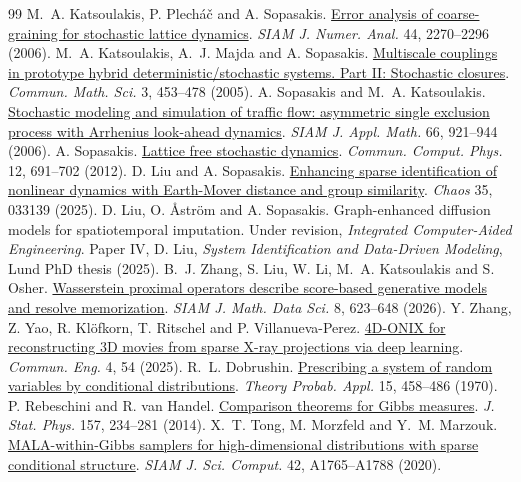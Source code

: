 \documentclass[12pt,a4paper]{article}
\begin{document}
\begingroup
\fontsize{9}{10.5}\selectfont
\begin{thebibliography}{99}
\setlength{\itemsep}{0pt}\setlength{\parskip}{0pt}
 M.~A. Katsoulakis, P. Plech\'a\v{c} and A. Sopasakis. \href{https://doi.org/10.1137/050637339}{Error analysis of coarse-graining for stochastic lattice dynamics}. \emph{SIAM J. Numer. Anal.} 44, 2270--2296 (2006).
 M.~A. Katsoulakis, A.~J. Majda and A. Sopasakis. \href{https://doi.org/10.4310/CMS.2005.v3.n3.a9}{Multiscale couplings in prototype hybrid deterministic/stochastic systems. Part II: Stochastic closures}. \emph{Commun. Math. Sci.} 3, 453--478 (2005).
 A. Sopasakis and M.~A. Katsoulakis. \href{https://doi.org/10.1137/040617790}{Stochastic modeling and simulation of traffic flow: asymmetric single exclusion process with Arrhenius look-ahead dynamics}. \emph{SIAM J. Appl. Math.} 66, 921--944 (2006).
 A. Sopasakis. \href{https://doi.org/10.4208/cicp.110211.200611a}{Lattice free stochastic dynamics}. \emph{Commun. Comput. Phys.} 12, 691--702 (2012).
 D. Liu and A. Sopasakis. \href{https://doi.org/10.1063/5.0214404}{Enhancing sparse identification of nonlinear dynamics with Earth-Mover distance and group similarity}. \emph{Chaos} 35, 033139 (2025).
 D. Liu, O. \AA{}str\"om and A. Sopasakis. Graph-enhanced diffusion models for spatiotemporal imputation. Under revision, \emph{Integrated Computer-Aided Engineering}. Paper IV, D. Liu, \emph{System Identification and Data-Driven Modeling}, Lund PhD thesis (2025).
 B.~J. Zhang, S. Liu, W. Li, M.~A. Katsoulakis and S. Osher. \href{https://doi.org/10.1137/24M1644584}{Wasserstein proximal operators describe score-based generative models and resolve memorization}. \emph{SIAM J. Math. Data Sci.} 8, 623--648 (2026).
 Y. Zhang, Z. Yao, R. Kl\"ofkorn, T. Ritschel and P. Villanueva-Perez. \href{https://doi.org/10.1038/s44172-025-00390-w}{4D-ONIX for reconstructing 3D movies from sparse X-ray projections via deep learning}. \emph{Commun. Eng.} 4, 54 (2025).
 R.~L. Dobrushin. \href{https://doi.org/10.1137/1115049}{Prescribing a system of random variables by conditional distributions}. \emph{Theory Probab. Appl.} 15, 458--486 (1970).
 P. Rebeschini and R. van Handel. \href{https://doi.org/10.1007/s10955-014-1087-7}{Comparison theorems for Gibbs measures}. \emph{J. Stat. Phys.} 157, 234--281 (2014).
 X.~T. Tong, M. Morzfeld and Y.~M. Marzouk. \href{https://doi.org/10.1137/19M1284014}{MALA-within-Gibbs samplers for high-dimensional distributions with sparse conditional structure}. \emph{SIAM J. Sci. Comput.} 42, A1765--A1788 (2020).

\end{thebibliography}
\end{document}
